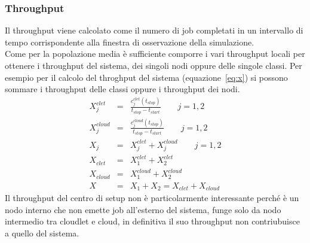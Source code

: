{\subsubsection{Throughput}
Il throughput viene calcolato come il numero di job completati in un intervallo
di tempo corrispondente alla finestra di osservazione della simulazione.\\
Come per la popolazione media è sufficiente comporre i vari throughput locali
per ottenere i throughput del sistema, dei singoli nodi oppure delle singole
classi. Per esempio per il calcolo del throghput del sistema
(equazione~\ref{eq:x}) si possono sommare i throughput delle classi oppure i
throughput dei nodi.
{\setlength\arraycolsep{2pt}
\begin{eqnarray}
X_j^{clet} & = & \frac{c_j^{clet}(t_{stop})}{t_{stop} - t_{start}} 
\qquad j = 1, 2 
\\[10pt]
X_j^{cloud} & = & \frac{c_j^{cloud}(t_{stop})}{t_{stop} - t_{start}} 
\qquad j = 1, 2 
\\[10pt]
X_j & = & X_j^{clet} + X_j^{cloud}
\qquad j = 1, 2 
\\[10pt]
X_{clet} & = & X_1^{clet} + X_2^{clet}
\\[10pt]
X_{cloud} & = & X_1^{cloud} + X_2^{cloud}
\\[10pt]
X & = & X_1 + X_2 = X_{clet} + X_{cloud}
\end{eqnarray}
Il throughput del centro di setup non è particolarmente interessante perché è un
nodo interno che non emette job all'esterno del sistema, funge solo da nodo
intermedio tra cloudlet e cloud, in definitiva il suo throughput non
contriubuisce a quello del sistema.
%
}}
